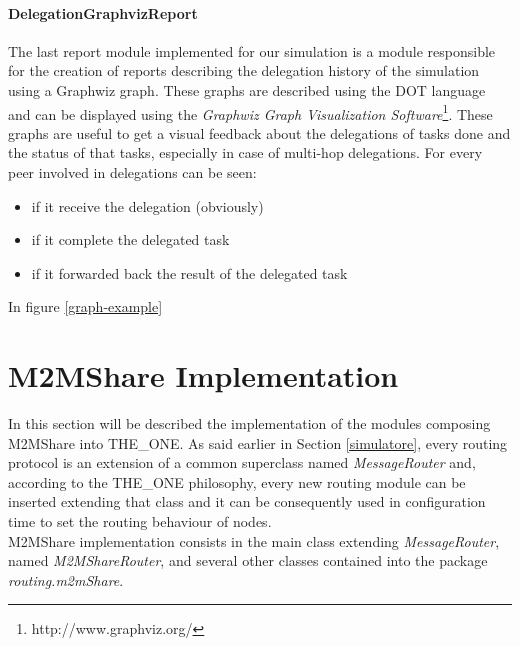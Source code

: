 \paragraph{DelegationGraphvizReport}
The last report module implemented for our simulation is a module responsible for the creation of reports describing the delegation history of the simulation using a Graphwiz graph. These graphs are described using the DOT language and can be displayed using the \textit{Graphwiz Graph Visualization Software}\footnote{http://www.graphviz.org/}. These graphs are useful to get a visual feedback about the delegations of tasks done and the status of that tasks, especially in case of multi-hop delegations. For every peer involved in delegations can be seen:
\begin{itemize}
\item if it receive the delegation (obviously)
\item if it complete the delegated task
\item if it forwarded back the result of the delegated task
\end{itemize}
In figure \ref{graph-example}


\section{M2MShare Implementation}
In this section will be described the implementation of the modules composing M2MShare into THE\_ONE. As said earlier in Section \ref{simulatore}, every routing protocol is an extension of a common superclass named \textit{MessageRouter} and, according to the THE\_ONE philosophy, every new routing module can be inserted extending that class and it can be consequently used in configuration time to set the routing behaviour of nodes.
\\

M2MShare implementation consists in the main class extending \textit{MessageRouter}, named \textit{M2MShareRouter}, and several other classes contained into the package \textit{routing.m2mShare}.

